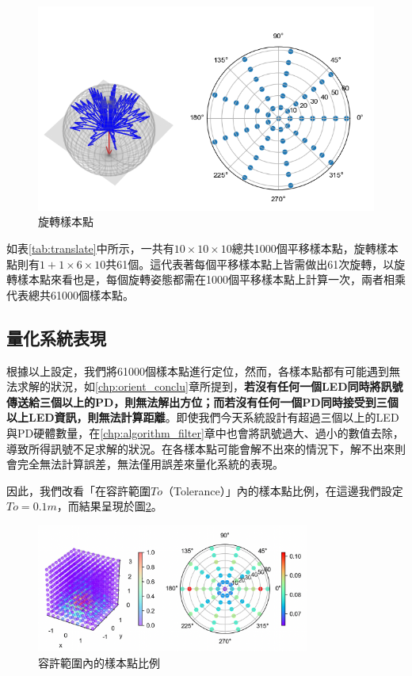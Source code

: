 \begin{figure}[h]
    \centering
    \includegraphics[width=12cm]{ch4pic/rotate_sample.png}
    \caption{旋轉樣本點}
    \label{pic:rotate_sample}
\end{figure}


如表\ref{tab:translate}中所示，一共有$10\times 10\times 10$總共1000個平移樣本點，旋轉樣本點則有$1+1\times 6\times 10$共61個。這代表著每個平移樣本點上皆需做出61次旋轉，以旋轉樣本點來看也是，每個旋轉姿態都需在1000個平移樣本點上計算一次，兩者相乘代表總共61000個樣本點。






\subsection{量化系統表現}
\label{chp:evaluate_method}

根據以上設定，我們將61000個樣本點進行定位，然而，各樣本點都有可能遇到無法求解的狀況，如\ref{chp:orient_conclu}章所提到，\textbf{若沒有任何一個LED同時將訊號傳送給三個以上的PD，則無法解出方位；而若沒有任何一個PD同時接受到三個以上LED資訊，則無法計算距離}。即使我們今天系統設計有超過三個以上的LED與PD硬體數量，在\ref{chp:algorithm_filter}章中也會將訊號過大、過小的數值去除，導致所得訊號不足求解的狀況。在各樣本點可能會解不出來的情況下，解不出來則會完全無法計算誤差，無法僅用誤差來量化系統的表現。



因此，我們改看「在容許範圍$To$（Tolerance）」內的樣本點比例，在這邊我們設定$To=0.1m$，而結果呈現於圖\ref{pic:sample_out}。

\begin{figure}[ht]
    \centering
    \includegraphics[width=9cm]{ch4pic/sample_out.png}
    \caption{容許範圍內的樣本點比例}
    \label{pic:sample_out}
\end{figure}

